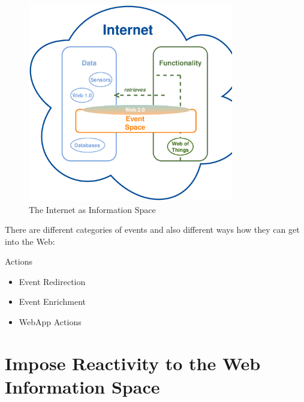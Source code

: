 \begin{figure}[!ht]
  \centering
  \includegraphics[width=0.8\textwidth]{figures/InformationSpace}
  \caption{The Internet as Information Space}
  \label{fig:InformationSpace}
\end{figure}
There are different categories of events and also different ways how they can get into the Web:




Actions
\begin{itemize}
  \item Event Redirection
  \item Event Enrichment
  \item WebApp Actions
\end{itemize}


\section{Impose Reactivity to the Web Information Space}

